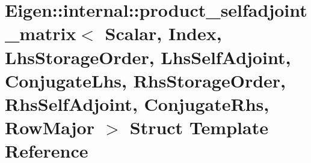 \hypertarget{struct_eigen_1_1internal_1_1product__selfadjoint__matrix_3_01_scalar_00_01_index_00_01_lhs_stora8fa4562df6c92574330a318a01a976cf}{}\section{Eigen\+:\+:internal\+:\+:product\+\_\+selfadjoint\+\_\+matrix$<$ Scalar, Index, Lhs\+Storage\+Order, Lhs\+Self\+Adjoint, Conjugate\+Lhs, Rhs\+Storage\+Order, Rhs\+Self\+Adjoint, Conjugate\+Rhs, Row\+Major $>$ Struct Template Reference}
\label{struct_eigen_1_1internal_1_1product__selfadjoint__matrix_3_01_scalar_00_01_index_00_01_lhs_stora8fa4562df6c92574330a318a01a976cf}
